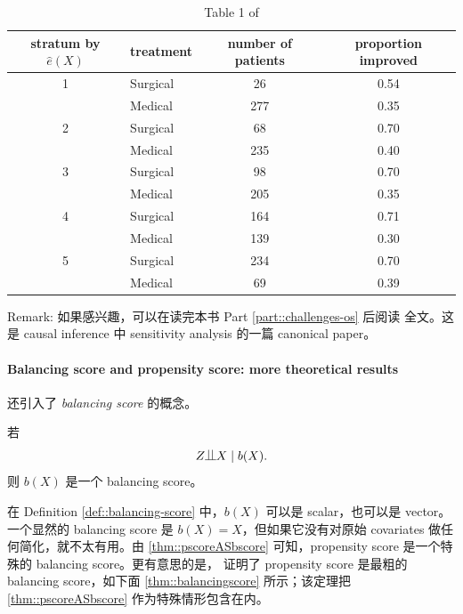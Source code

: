 \begin{table}
\caption{Table 1 of \citet{Rosenbaum::1983JRSSB}}\label{table::rr1983table1}
\begin{tabular}{clcc}
\hline 
stratum by $\hat{e}(X)$ & treatment &  number of patients & proportion improved\\
\hline 1 & Surgical & 26 & 0.54 \\
& Medical & 277 & 0.35 \\
2 & Surgical & 68 & 0.70 \\
& Medical & 235 & 0.40 \\
3 & Surgical & 98 & 0.70 \\
& Medical & 205 & 0.35 \\
4 & Surgical & 164 & 0.71 \\
& Medical & 139 & 0.30 \\
5 & Surgical & 234 & 0.70 \\
& Medical & 69 & 0.39 \\
\hline
\end{tabular}
\end{table}


Remark:   如果感兴趣，可以在读完本书 Part \cref{part::challenges-os} 后阅读 \citet{Rosenbaum::1983JRSSB} 全文。这是 causal inference 中 sensitivity analysis 的一篇 canonical paper。

 


\paragraph{Balancing score and propensity score: more theoretical results}
\label{hw::balancingscore-rr1983}


\citet{rosenbaum1983central} 还引入了 {\it balancing score} 的概念。

\begin{definition}
\label{def::balancing-score}
  若
  $$
  Z\ind X\mid b(X).
  $$
  则 $b(X)$ 是一个 balancing score。
\end{definition}

在 Definition \cref{def::balancing-score} 中，$b(X)$ 可以是 scalar，也可以是 vector。一个显然的 balancing score 是 $b(X) = X$，但如果它没有对原始 covariates 做任何简化，就不太有用。由 \cref{thm::pscoreASbscore} 可知，propensity score 是一个特殊的 balancing score。更有意思的是，\citet{rosenbaum1983central} 证明了 propensity score 是最粗的 balancing score，如下面 \cref{thm::balancingscore} 所示；该定理把 \cref{thm::pscoreASbscore} 作为特殊情形包含在内。


